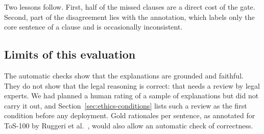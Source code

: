 Two lessons follow. First, half of the missed clauses are a direct cost of the gate. Second, part of the disagreement lies with the annotation, which labels only the core sentence of a clause and is occasionally inconsistent.

\subsection{Limits of this evaluation}

The automatic checks show that the explanations are grounded and faithful. They do not show that the legal reasoning is correct: that needs a review by legal experts. We had planned a human rating of a sample of explanations but did not carry it out, and Section~\ref{sec:ethics-conditions} lists such a review as the first condition before any deployment. Gold rationales per sentence, as annotated for ToS-100 by Ruggeri et al.~\citep{ruggeri2022memory}, would also allow an automatic check of correctness.
